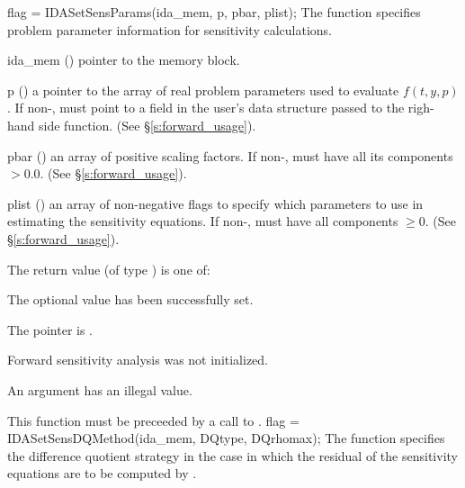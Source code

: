 
{
  flag = IDASetSensParams(ida\_mem, p, pbar, plist);
}
{
  The function  specifies problem parameter information
  for sensitivity calculations.
}
{
  \begin{args}
  \item[ida\_mem] ()
    pointer to the {\idas} memory block.
  \item[p] ()
    a pointer to the array of real problem parameters used to evaluate $f(t,y,p)$.
    If non-,  must point to a field in the user's data structure
     passed to the righ-hand side function.
    (See \S\ref{s:forward_usage}).
  \item[pbar] ()
    an array of  positive scaling factors. If non-,  must
    have all its components $> 0.0$.
    (See \S\ref{s:forward_usage}).
  \item[plist] () 
    an array of  non-negative flags to specify which parameters to use in
    estimating the sensitivity equations. If non-,  must
    have all components $\ge 0$.
    (See \S\ref{s:forward_usage}).
  \end{args}
}
{
  The return value  (of type ) is one of:
  \begin{args}
  \item[\Id{IDA\_SUCCESS}] 
    The optional value has been successfully set.
  \item[\Id{IDA\_MEM\_NULL}]
    The  pointer is .
  \item[\Id{IDA\_NO\_SENS}]
    Forward sensitivity analysis was not initialized.
  \item[\Id{IDA\_ILL\_INPUT}]
    An argument has an illegal value.
  \end{args}
}
{
  {\warn}This function must be preceeded by a call to .
}
{
  flag = IDASetSensDQMethod(ida\_mem, DQtype, DQrhomax);
}
{
  The function  specifies the difference quotient strategy in
  the case in which the residual of the sensitivity equations are to
  be computed by {\idas}.
}
